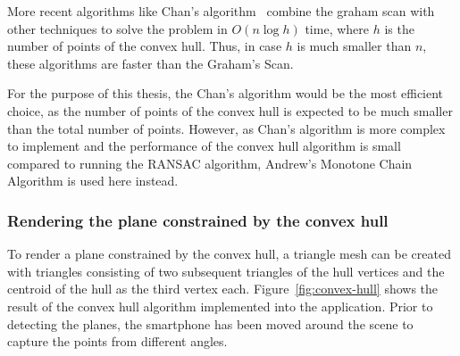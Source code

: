 
More recent algorithms like Chan's algorithm~\cite{chan_optimal_1996} combine the graham scan with other techniques to solve the problem in $O(n \log h)$ time,
where $h$ is the number of points of the convex hull.
Thus, in case $h$ is much smaller than $n$, these algorithms are faster than the Graham's Scan.

For the purpose of this thesis, the Chan's algorithm would be the most efficient choice,
as the number of points of the convex hull is expected to be much smaller than the total number of points.
However, as Chan's algorithm is more complex to implement and the performance of the convex hull algorithm
is small compared to running the RANSAC algorithm, Andrew's Monotone Chain Algorithm is used here instead.



\subsubsection{Rendering the plane constrained by the convex hull}
To render a plane constrained by the convex hull,
a triangle mesh can be created with triangles consisting of two subsequent triangles of the hull vertices and the centroid of the hull as the third vertex each.
Figure~\ref{fig:convex-hull} shows the result of the convex hull algorithm implemented into the application.
Prior to detecting the planes, the smartphone has been moved around the scene to capture the points from different angles.

